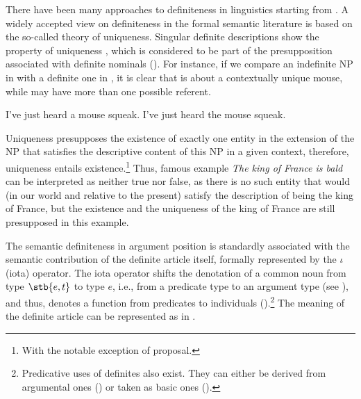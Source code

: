\documentclass[output=paper]{langscibook}
\begin{document}
\noindent There have been many approaches to definiteness in linguistics
starting from \citet{Frege1892}. A widely accepted view on definiteness in the formal semantic literature is based on the so-called theory of uniqueness.
Singular definite descriptions show the property of uniqueness \citep{Russell1905}, which is considered to be part of the presupposition associated with definite nominals (\citealt{Frege1879,Strawson1950}).
For instance, if we compare an indefinite NP in  with a definite one in , it is clear that  is about a contextually unique mouse, while  may have more than one possible referent.

\ea
\ea \label{ex:seres:21a}I've just heard a mouse squeak.
\ex \label{ex:seres:21b}
I've just heard the mouse squeak.
\z \z

\noindent Uniqueness presupposes the existence of exactly one entity in the extension of the NP that satisfies the descriptive content of this NP in a given context,
therefore, uniqueness entails existence.\footnote{With the notable exception of  proposal.} Thus,  famous example \textit{The king of France is bald} can be interpreted as neither true nor false, as there is no such entity that would (in our world and relative to the present) satisfy the description of being the king of France, but the existence and the uniqueness of the king of France are still presupposed in this example.

The semantic definiteness in argument position is standardly associated with the semantic contribution of the definite article itself, formally represented by the $\iota$ (iota) operator.
The iota operator shifts the denotation of a common noun from type $\stb{e,t}$ to type $e$, i.e., from a predicate type to an argument type (see \citealt[998]{Heim2011}), and
thus, denotes a function from predicates to individuals (\citealt{Frege1879,Elbourne2005,Elbourne2013,Heim2011}).\footnote{Predicative uses of definites also exist. They can either be derived from argumental ones (\citealt{Partee1987,Winter2001}) or taken as basic ones (\citealt{GraffFara2001,Coppock.Beaver2015}).}
The meaning of the definite article can be represented as in .
\end{document}
